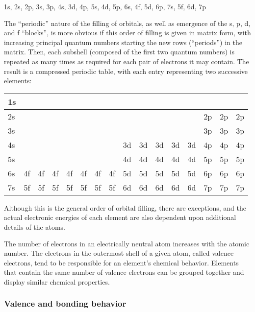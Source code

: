 \documentclass[
]{article}
\begin{document}
1s, 2s, 2p, 3s, 3p, 4s, 3d, 4p, 5s, 4d, 5p, 6s, 4f, 5d, 6p, 7s, 5f, 6d,
7p

The ``periodic'' nature of the filling of orbitals, as well as emergence
of the s, p, d, and f ``blocks'', is more obvious if this order of
filling is given in matrix form, with increasing principal quantum
numbers starting the new rows (``periods'') in the matrix. Then, each
subshell (composed of the first two quantum numbers) is repeated as many
times as required for each pair of electrons it may contain. The result
is a compressed periodic table, with each entry representing two
successive elements:

\begin{longtable}[]{@{}llllllllllllllll@{}}
\toprule
1s & & & & & & & & & & & & & & &\tabularnewline
\midrule
\endhead
2s & & & & & & & & & & & & & 2p & 2p & 2p\tabularnewline
3s & & & & & & & & & & & & & 3p & 3p & 3p\tabularnewline
4s & & & & & & & & 3d & 3d & 3d & 3d & 3d & 4p & 4p & 4p\tabularnewline
5s & & & & & & & & 4d & 4d & 4d & 4d & 4d & 5p & 5p & 5p\tabularnewline
6s & 4f & 4f & 4f & 4f & 4f & 4f & 4f & 5d & 5d & 5d & 5d & 5d & 6p & 6p
& 6p\tabularnewline
7s & 5f & 5f & 5f & 5f & 5f & 5f & 5f & 6d & 6d & 6d & 6d & 6d & 7p & 7p
& 7p\tabularnewline
\bottomrule
\end{longtable}

Although this is the general order of orbital filling, there are
exceptions, and the actual electronic energies of each element are also
dependent upon additional details of the atoms.

The number of electrons in an electrically neutral atom increases with
the atomic number. The electrons in the outermost shell of a given atom,
called valence electrons, tend to be responsible for an element's
chemical behavior. Elements that contain the same number of valence
electrons can be grouped together and display similar chemical
properties.

\hypertarget{valence-and-bonding-behavior}{%
\subsubsection{Valence and bonding
behavior}\label{valence-and-bonding-behavior}}
\end{document}
